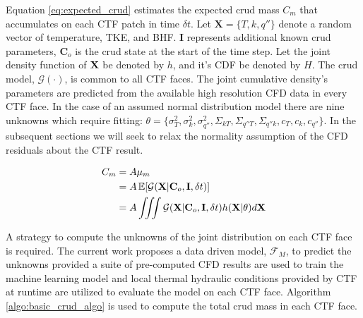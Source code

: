 Equation \ref{eq:expected_crud} estimates the expected crud mass $C_m$ that accumulates on each CTF patch in time $\delta t$.  Let $\mathbf X= \{T, k, q''\}$ denote a random vector of temperature, TKE, and BHF. $\mathbf I$ represents additional known crud parameters, $\mathbf C_o$ is the crud state at the start of the time step.  Let the joint density function of $\bf X$ be denoted by $h$, and it's CDF be denoted by $H$.  The crud model, $\mathcal G(\cdot)$, is common to all CTF faces.  The joint cumulative density's parameters are predicted from the available high resolution CFD data in every CTF face.  In the case of an assumed normal distribution model there are nine unknowns which require fitting:  $\theta = \{ \sigma^2_T, \sigma^2_k, \sigma^2_{q''}, \Sigma_{kT}, \Sigma_{q''T}, \Sigma_{q''k}, c_T, c_k, c_{q''} \}$.  In the subsequent sections we will seek to relax the normality assumption of the CFD residuals about the CTF result.

\begin{align}
        C_m &= A \mu_{m} \nonumber \\
        &= A \operatorname*{\mathbb{E}}[\mathcal G(\mathbf X|\mathbf C_o, \mathbf I, \delta t)] \nonumber \\
        &= A \iiint \mathcal G(\mathbf X|\mathbf C_o, \mathbf I, \delta t) h(\mathbf X|\theta) d \mathbf X
        \label{eq:expected_crud}
\end{align}

A strategy to compute the unknowns of the joint distribution on each CTF face is required.  The current work proposes a data driven model, $\mathcal F_M$, to predict the unknowns provided a suite of pre-computed CFD results are used to train the machine learning model and local thermal hydraulic conditions provided by CTF at runtime are utilized to evaluate the model on each CTF face. Algorithm \ref{algo:basic_crud_algo} is used to compute the total crud mass in each CTF face.


